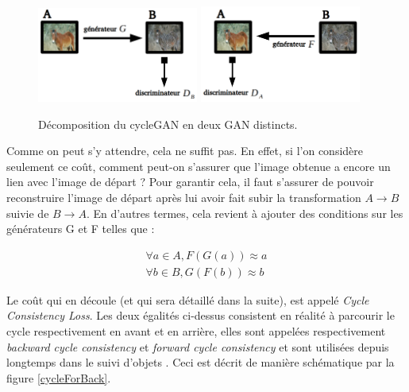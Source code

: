 \begin{figure}[!h]
\centering
\includegraphics[width=150pt]{"images/cycle/cycle_ganG"}
\hspace*{10mm}
\includegraphics[width=150pt]{"images/cycle/cycle_ganF"}
\caption{Décomposition du cycleGAN en deux GAN distincts.}
\label{cycle_ganGF}
\end{figure}

Comme on peut s'y attendre, cela ne suffit pas. En effet, si l'on considère seulement ce coût, comment peut-on s'assurer que l'image obtenue a encore un lien avec l'image de départ ? Pour garantir cela, il faut s'assurer de pouvoir reconstruire l'image de départ après lui avoir fait subir  la transformation $ A \rightarrow B $ suivie de $ B \rightarrow A $. En d'autres termes, cela revient à ajouter des conditions sur les générateurs G et F telles que :

\begin{equation}
\begin{split}
\forall a \in A, F(G(a)) \approx a \\
\forall b \in B, G(F(b)) \approx b
\end{split}
\end{equation}

Le coût qui en découle (et qui sera détaillé dans la suite), est appelé \textit{Cycle Consistency Loss}. Les deux égalités ci-dessus consistent en réalité à parcourir le cycle respectivement en avant et en arrière, elles sont appelées respectivement \textit{backward cycle consistency} et \textit{forward cycle consistency} et sont utilisées depuis longtemps dans le suivi d'objets \cite{kalal_forward-backward_2010}. Ceci est décrit de manière schématique par la figure \ref{cycleForBack}.\\

